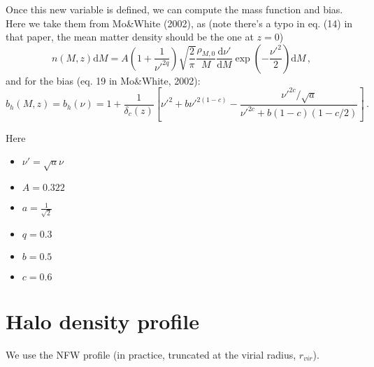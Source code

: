 \documentclass[10pt,a4paper]{article}
\begin{document}
Once this new variable is defined, we can compute the mass function and bias. Here we take them from Mo\&White (2002), as
(note there's a typo in eq. (14) in that paper, the mean matter density should be the one at $z=0$)
\begin{equation}
n(M,z)\mathrm{d}M = A \left(1 + \frac{1}{\nu'^{2q}}\right) \sqrt{\frac{2}{\pi}} \frac{\rho_{M,0}}{M} \frac{\mathrm{d}\nu'}{\mathrm{d}M} \exp\left(-\frac{\nu'^2}{2}\right)\mathrm{d}M \, ,
\end{equation}
and for the bias (eq. 19 in Mo\&White, 2002):
\begin{equation}
b_h(M,z) = b_h(\nu) = 1 + \frac{1}{\delta_c(z)}\left[ \nu'^2 + b\nu'^{2(1-c)} - \frac{\nu'^{2c}/\sqrt{a}}{\nu'^{2c} + b(1-c)(1 -c/2)}\right] \, .
\end{equation}

Here
\begin{itemize}
\item $\nu' = \sqrt{a}\nu$
\item $A = 0.322$
\item $a = \frac{1}{\sqrt{2}}$
\item $q = 0.3$
\item $b = 0.5$
\item $c = 0.6$
\end{itemize}


\section{Halo density profile}

We use the NFW profile (in practice, truncated at the virial radius, $r_{vir}$).
\end{document}
